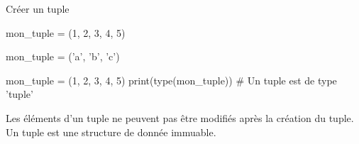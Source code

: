 	
\begin{easybox}{Créer un tuple}{}
	\begin{minipage}{0.48\linewidth}
		\begin{CodePythontexAlt}[TaillePolice=\normalsize, Largeur=1\linewidth,Centre,PremLigne=1, Lignes=true]{}
mon_tuple = (1, 2, 3, 4, 5)
		\end{CodePythontexAlt}
	\end{minipage}\hfill
	\begin{minipage}{0.48\linewidth}
		\begin{CodePythontexAlt}[TaillePolice=\normalsize, Largeur=1\linewidth,Centre,PremLigne=1, Lignes=true]{}
mon_tuple = ('a', 'b', 'c')
		\end{CodePythontexAlt}
	\end{minipage}


\begin{ConsolePythontex}[TaillePolice=\normalsize, Label=false]{}
mon_tuple = (1, 2, 3, 4, 5)
print(type(mon_tuple))		# Un tuple est de type 'tuple'
		\end{ConsolePythontex}
\end{easybox}

	\begin{propriete}{}
		Les éléments d'un tuple ne peuvent pas être modifiés après la création du tuple. Un tuple est une structure de donnée immuable.

	\end{propriete}

